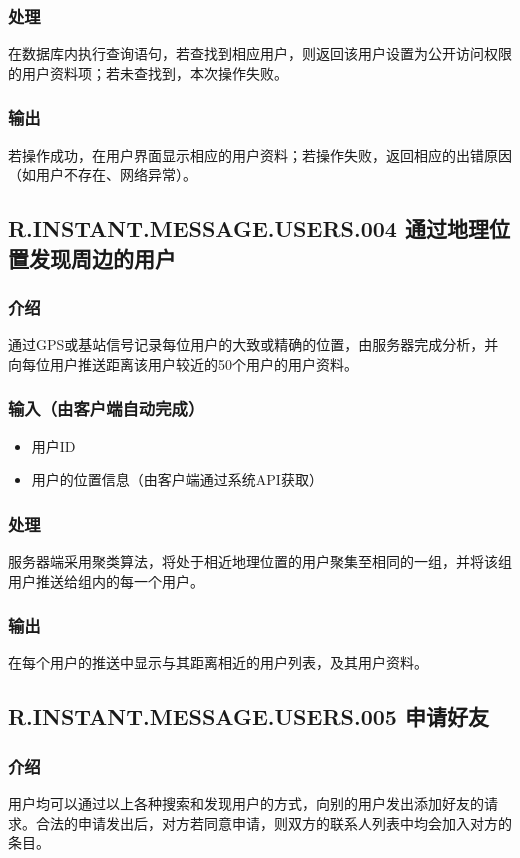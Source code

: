 \subsubsection{处理}
在数据库内执行查询语句，若查找到相应用户，则返回该用户设置为公开访问权限的用户资料项；若未查找到，本次操作失败。
\subsubsection{输出}
若操作成功，在用户界面显示相应的用户资料；若操作失败，返回相应的出错原因（如用户不存在、网络异常）。

\subsection{R.INSTANT.MESSAGE.USERS.004 通过地理位置发现周边的用户}
\subsubsection{介绍}
通过GPS或基站信号记录每位用户的大致或精确的位置，由服务器完成分析，并向每位用户推送距离该用户较近的50个用户的用户资料。
\subsubsection{输入（由客户端自动完成）}
\begin{itemize}
	\item 用户ID
	\item 用户的位置信息（由客户端通过系统API获取）
\end{itemize}
\subsubsection{处理}
服务器端采用聚类算法，将处于相近地理位置的用户聚集至相同的一组，并将该组用户推送给组内的每一个用户。
\subsubsection{输出}
在每个用户的推送中显示与其距离相近的用户列表，及其用户资料。

\subsection{R.INSTANT.MESSAGE.USERS.005 申请好友}
\subsubsection{介绍}
用户均可以通过以上各种搜索和发现用户的方式，向别的用户发出添加好友的请求。合法的申请发出后，对方若同意申请，则双方的联系人列表中均会加入对方的条目。
